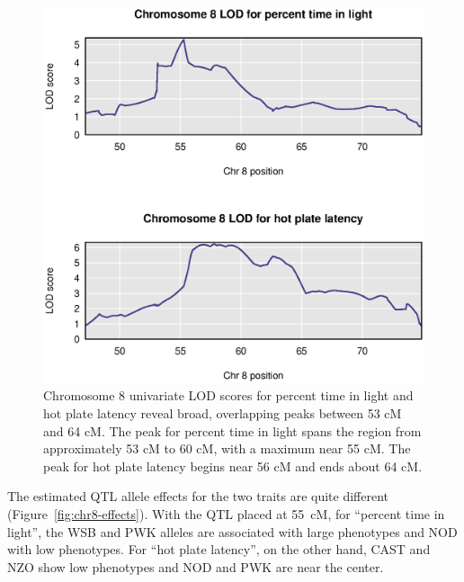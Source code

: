 \documentclass[12pt,twoside, lineno]{gsajnl}
\begin{document}
\begin{figure}
\includegraphics[width = \textwidth]{../Rmd/chr8-lods.eps}
\caption{Chromosome 8 univariate LOD scores for percent time in light
  and hot plate latency reveal broad, overlapping peaks between 53 cM
  and 64 cM. The peak for percent time in light spans the region from
  approximately 53 cM to 60 cM, with a maximum near 55 cM. The peak
  for hot plate latency begins near 56 cM and ends about 64 cM.}
\label{fig:chr8-lod}
\end{figure}


The estimated QTL allele effects for the two traits are quite
different (Figure~\ref{fig:chr8-effects}).
With the QTL placed at 55~cM, for ``percent time in light'', the WSB and PWK alleles are associated
with large phenotypes and NOD with low phenotypes.
For ``hot plate latency'', on the other hand,
CAST and NZO show low phenotypes and NOD and PWK are near the center.
\end{document}
